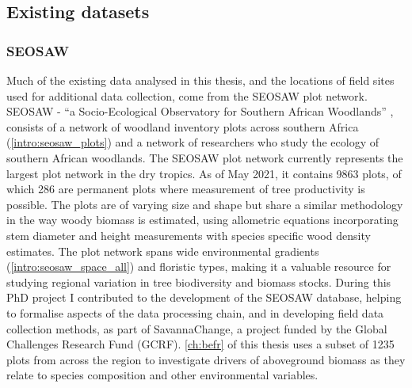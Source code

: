 \begin{refsection}
\subsection{Existing datasets}
\label{intro:ssec:existing_data}

\subsubsection{SEOSAW}
\label{intro:sssec:seosaw}

Much of the existing data analysed in this thesis, and the locations of field sites used for additional data collection, come from the SEOSAW plot network. SEOSAW - ``a Socio-Ecological Observatory for Southern African Woodlands'' \citep{Ryan2020}, consists of a network of woodland inventory plots across southern Africa (\autoref{intro:seosaw_plots}) and a network of researchers who study the ecology of southern African woodlands. The SEOSAW plot network currently represents the largest plot network in the dry tropics. As of May 2021, it contains 9863 plots, of which 286 are permanent plots where measurement of tree productivity is possible. The plots are of varying size and shape but share a similar methodology in the way woody biomass is estimated, using allometric equations incorporating stem diameter and height measurements with species specific wood density estimates. The plot network spans wide environmental gradients (\autoref{intro:seosaw_space_all}) and floristic types, making it a valuable resource for studying regional variation in tree biodiversity and biomass stocks. During this PhD project I contributed to the development of the SEOSAW database, helping to formalise aspects of the data processing chain, and in developing field data collection methods, as part of SavannaChange, a project funded by the Global Challenges Research Fund (GCRF). \autoref{ch:befr} of this thesis uses a subset of 1235 plots from across the region to investigate drivers of aboveground biomass as they relate to species composition and other environmental variables. 


\end{refsection}
